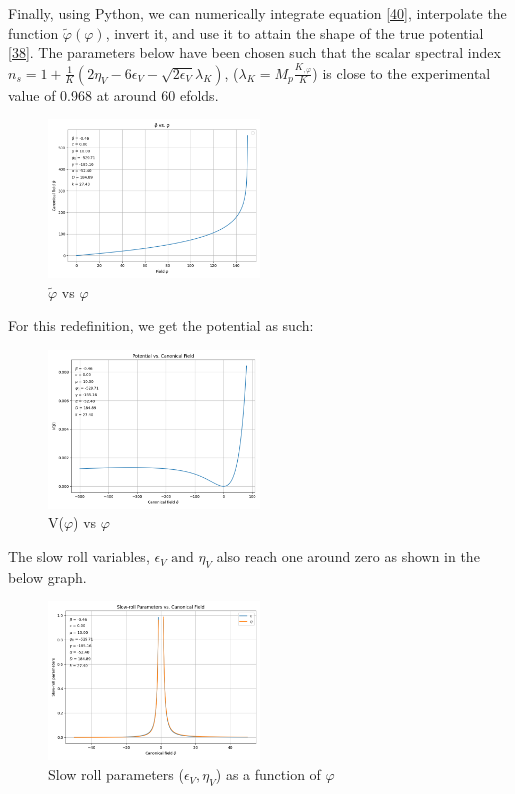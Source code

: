 \documentclass[aps,prd,reprint,preprintnumbers,showpacs,floatfix,nofootinbib,superscript address]{revtex4-2}
\begin{document}
Finally, using Python, we can numerically integrate equation \ref{40}, interpolate the function $\tilde{\varphi}(\varphi)$, invert it, and use it to attain the shape of the true potential \ref{38}. The parameters below have been chosen such that the scalar spectral index $n_s = 1 + \frac{1}{K}(2\eta_V - 6 \epsilon_V -\sqrt{2\epsilon_V}\lambda_K)$, \cite{chung2003running} ($\lambda_K = M_p \frac{K_{,\varphi}}{K}$) is close to the experimental value of 0.968 at around 60 efolds.

\begin{figure}[h!]
    \centering
    \includegraphics[width=0.5\textwidth]{Python/Figures/Redefinition with correct parameters.png}
    \caption{$\tilde{\varphi}$ vs $\varphi$}
    \label{Canonical field vs field}
\end{figure}
For this redefinition, we get the potential as such:

\begin{figure}[h!]
    \centering
    \includegraphics[width=0.5\textwidth]{Python/Figures/Potential with correct parameters.png}
    \caption{V($\varphi$) vs $\varphi$}
    \label{Full Potential}
\end{figure}

The slow roll variables, $\epsilon_V \, \, \text{and} \, \, \eta_V$ also reach one around zero as shown in the below graph.

\begin{figure}[h!]
    \centering
    \includegraphics[width=0.5\textwidth]{Python/Figures/Full Slow Roll Parameters.png}
    \caption{Slow roll parameters ($\epsilon_V , \eta_V$) as a function of $\varphi$}
    \label{Slow Roll Parameters}
\end{figure}
\end{document}
